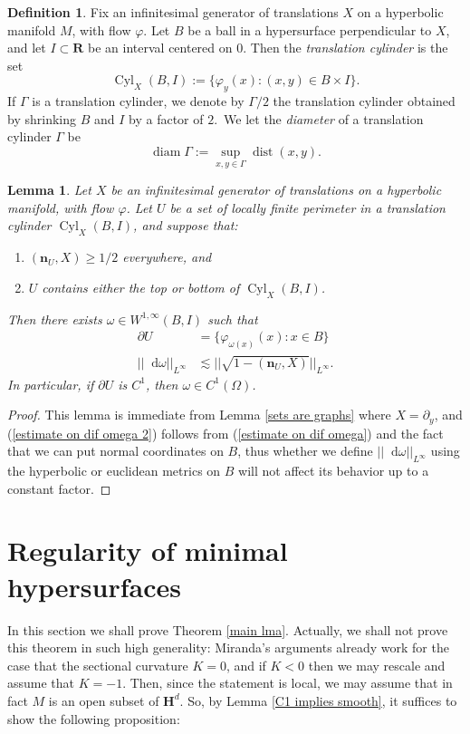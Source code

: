 \documentclass[reqno,10pt]{amsart}
\newcommand{\RR}{\mathbf{R}}
\newcommand{\Hyp}{\mathbf H}
\DeclareMathOperator{\Cyl}{Cyl}
\DeclareMathOperator{\diam}{diam}
\newcommand*\dif{\mathop{}\!\mathrm{d}}
\DeclareMathOperator{\dist}{dist}
\newcommand{\normal}{\mathbf n}
\newcommand{\dfn}[1]{\emph{#1}\index{#1}}
\newtheorem{lemma}[theorem]{Lemma}
\theoremstyle{definition}
\newtheorem{definition}[theorem]{Definition}
\numberwithin{equation}{section}
\begin{document}
\begin{definition}
Fix an infinitesimal generator of translations $X$ on a hyperbolic manifold $M$, with flow $\varphi$.
Let $B$ be a ball in a hypersurface perpendicular to $X$, and let $I \subset \RR$ be an interval centered on $0$.
Then the \dfn{translation cylinder} is the set
$$\Cyl_X(B, I) := \{\varphi_y(x): (x, y) \in B \times I\}.$$
If $\Gamma$ is a translation cylinder, we denote by $\Gamma/2$ the translation cylinder obtained by shrinking $B$ and $I$ by a factor of $2$.\
We let the \dfn{diameter} of a translation cylinder $\Gamma$ be 
$$\diam \Gamma := \sup_{x, y \in \Gamma} \dist(x, y).$$
\end{definition}

\begin{lemma}\label{sets are graphs 2}
Let $X$ be an infinitesimal generator of translations on a hyperbolic manifold, with flow $\varphi$.
Let $U$ be a set of locally finite perimeter in a translation cylinder $\Cyl_X(B, I)$, and suppose that:
\begin{enumerate}
\item $(\normal_U, X) \geq 1/2$ everywhere, and 
\item $U$ contains either the top or bottom of $\Cyl_X(B, I)$.
\end{enumerate}
Then there exists $\omega \in W^{1, \infty}(B, I)$ such that
\begin{align}
\partial U &= \{\varphi_{\omega(x)}(x): x \in B\} \\
||\dif \omega||_{L^\infty} &\lesssim ||\sqrt{1 - (\normal_U, X)}||_{L^\infty}.\label{estimate on dif omega 2}
\end{align}
In particular, if $\partial U$ is $C^1$, then $\omega \in C^1(\Omega)$.
\end{lemma}
\begin{proof}
This lemma is immediate from Lemma \ref{sets are graphs} where $X = \partial_y$, and (\ref{estimate on dif omega 2}) follows from (\ref{estimate on dif omega}) and the fact that we can put normal coordinates on $B$, thus whether we define $||\dif \omega||_{L^\infty}$ using the hyperbolic or euclidean metrics on $B$ will not affect its behavior up to a constant factor.
\end{proof}





\section{Regularity of minimal hypersurfaces}\label{de Giorgi section}
In this section we shall prove Theorem \ref{main lma}.
Actually, we shall not prove this theorem in such high generality: Miranda's arguments already work for the case that the sectional curvature $K = 0$, and if $K < 0$ then we may rescale and assume that $K = -1$.
Then, since the statement is local, we may assume that in fact $M$ is an open subset of $\Hyp^d$.
So, by Lemma \ref{C1 implies smooth}, it suffices to show the following proposition:
\end{document}

